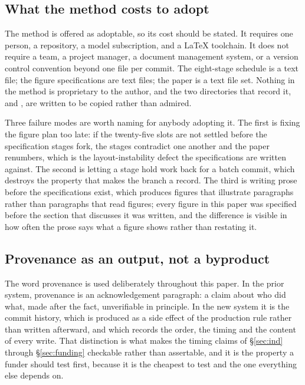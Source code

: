 \subsection{What the method costs to adopt}

The method is offered as adoptable, so its cost should be stated. It requires
one person, a repository, a model subscription, and a LaTeX toolchain. It does
not require a team, a project manager, a document management system, or a
version control convention beyond one file per commit. The eight-stage schedule
is a text file; the figure specifications are text files; the paper is a text
file set. Nothing in the method is proprietary to the author, and the two
directories that record it,  and
, are written to be copied rather than
admired.

Three failure modes are worth naming for anybody adopting it. The first is
fixing the figure plan too late: if the twenty-five slots are not settled before
the specification stages fork, the stages contradict one another and the paper
renumbers, which is the layout-instability defect the specifications are written
against. The second is letting a stage hold work back for a batch commit, which
destroys the property that makes the branch a record. The third is writing prose
before the specifications exist, which produces figures that illustrate
paragraphs rather than paragraphs that read figures; every figure in this paper
was specified before the section that discusses it was written, and the
difference is visible in how often the prose says what a figure shows rather
than restating it.

\subsection{Provenance as an output, not a byproduct}

The word provenance is used deliberately throughout this paper. In the prior
system, provenance is an acknowledgement paragraph: a claim about who did what,
made after the fact, unverifiable in principle. In the new system it is the
commit history, which is produced as a side effect of the production rule rather
than written afterward, and which records the order, the timing and the content
of every write. That distinction is what makes the timing claims of
\S\ref{sec:ind} through \S\ref{sec:funding} checkable rather than assertable,
and it is the property a funder should test first, because it is the cheapest to
test and the one everything else depends on.

